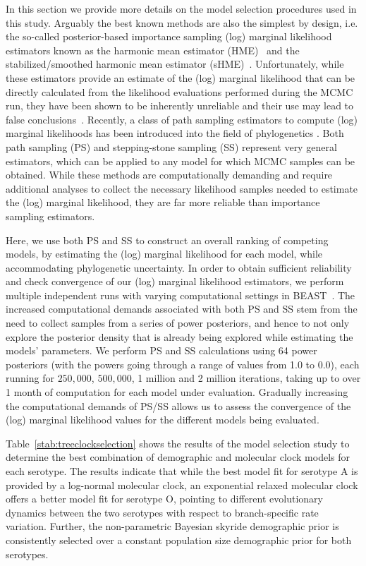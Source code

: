 \documentclass[a4paper,10pt]{article}
\begin{document}
In this section we provide more details on the model selection procedures used in this study.
Arguably the best known methods are also the simplest by design, i.e. the so-called posterior-based importance sampling (log) marginal likelihood estimators known as the harmonic mean estimator (HME)~\cite{Newton} and the stabilized/smoothed harmonic mean estimator (sHME)~\cite{M-suchard2005models}.
Unfortunately, while these estimators provide an estimate of the (log) marginal likelihood that can be directly calculated from the likelihood evaluations performed during the MCMC run, they have been shown to be inherently unreliable and their use may lead to false conclusions~\cite{M-LartillotPhilippe, M-Xie, M-Baele2012, M-Baele2013a, M-Baele2013b, M-Baele2013c}.
Recently, a class of path sampling estimators to compute (log) marginal likelihoods has been introduced into the field of phylogenetics \cite{M-LartillotPhilippe, M-Xie}.
Both path sampling (PS) and stepping-stone sampling (SS) represent very general estimators, which can be applied to any model for which MCMC samples can be obtained.
While these methods are computationally demanding and require additional analyses to collect the necessary likelihood samples needed to estimate the (log) marginal likelihood, they are far more reliable than importance sampling estimators.

Here, we use both PS and SS to construct an overall ranking of competing models, by estimating the (log) marginal likelihood for each model, while accommodating phylogenetic uncertainty.
In order to obtain sufficient reliability and check convergence of our (log) marginal likelihood estimators, we perform multiple independent runs with varying computational settings in BEAST~\cite{M-beast2012}.
The increased computational demands associated with both PS and SS stem from the need to collect samples from a series of power posteriors, and hence to not only explore the posterior density that is already being explored while estimating the models' parameters.
We perform PS and SS calculations using 64 power posteriors (with the powers going through a range of values from 1.0 to 0.0), each running for $250,000$, $500,000$, 1 million and 2 million iterations, taking up to over 1 month of computation for each model under evaluation.
Gradually increasing the computational demands of PS/SS allows us to assess the convergence of the (log) marginal likelihood values for the different models being evaluated.

Table~\ref{stab:treeclockselection} shows the results of the model selection study to determine the best combination of demographic and molecular clock models for each serotype.
The results indicate that while the best model fit for serotype A is provided by a log-normal molecular clock, an exponential relaxed molecular clock offers a better model fit for serotype O, pointing to different evolutionary dynamics between the two serotypes with respect to branch-specific rate variation. 
Further, the non-parametric Bayesian skyride demographic prior is consistently selected over a constant population size demographic prior for both serotypes. 
\end{document}
